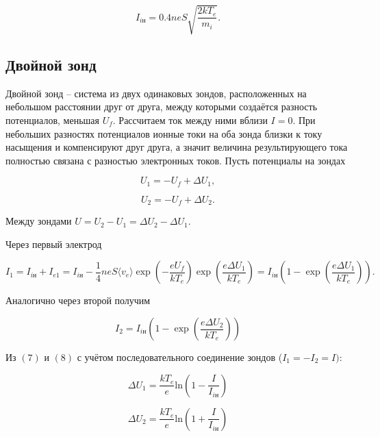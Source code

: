 \documentclass[a4paper, 12pt]{article}
\begin{document}
            \begin{equation}
                I_{i\text{н}} = 0.4 neS \sqrt{\dfrac{2kT_e}{m_i}}.
            \end{equation}

        \subsection*{Двойной зонд}

            Двойной зонд -- система из двух одинаковых зондов, расположенных на небольшом расстоянии друг от друга, между которыми создаётся разность потенциалов, меньшая $U_f$. Рассчитаем ток между ними вблизи $I=0$. При небольших разностях потенциалов ионные токи на оба зонда близки к току насыщения и компенсируют друг друга, а значит величина результирующего тока полностью связана с разностью электронных токов. Пусть потенциалы на зондах

            $$
                U_1 = -U_f + \Delta U_1,
            $$

            $$
                U_2 = -U_f + \Delta U_2.
            $$

            Между зондами $U = U_2 - U_1 = \Delta U_2 - \Delta U_1$.

            Через первый электрод

            \begin{equation}
                I_1 = I_{i\text{н}} + I_{e1} = I_{i\text{н}} - \dfrac{1}{4}neS\langle v_e\rangle \exp\left(-\dfrac{eU_f}{kT_e}\right)\exp\left(\dfrac{e\Delta U_1}{kT_e}\right)=I_{i\text{н}}\left(1 - \exp\left( \dfrac{e\Delta U_1}{kT_e} \right)\right).
            \end{equation}

            Аналогично через второй получим

            \begin{equation}
                I_2 = I_{i\text{н}}\left(1 - \exp\left( \dfrac{e\Delta U_2}{kT_e} \right)\right)
            \end{equation}

            Из $(7)$ и $(8)$ с учётом последовательного соединение зондов ($I_1 = -I_2 = I)$:

            $$
                \Delta U_1= \dfrac{kT_e}{e}\text{ln}\left(1 - \dfrac{I}{I_{i\text{н}}}\right)
            $$

            $$
                \Delta U_2= \dfrac{kT_e}{e}\text{ln}\left(1 + \dfrac{I}{I_{i\text{н}}}\right)
            $$
\end{document}
